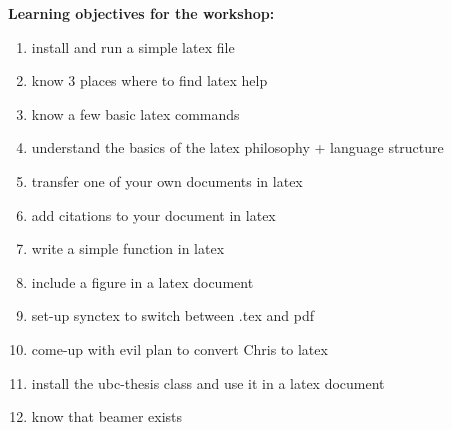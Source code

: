 \documentclass{article}
\begin{document}
\textbf{\large Learning objectives for the workshop:}

\begin{enumerate}
\item install and run a simple latex file 
\item know 3 places where to find latex help
\item know a few basic latex commands
\item understand the basics of the latex philosophy + language structure
\item transfer one of your own documents in latex
\item add citations to your document in latex
\item write a simple function in latex %
\item include a figure in a latex document
\item set-up synctex to switch between .tex and pdf
\item come-up with evil plan to convert Chris to latex
\item install the ubc-thesis class and use it in a latex document
\item know that beamer exists
\end{enumerate}
\end{document}
